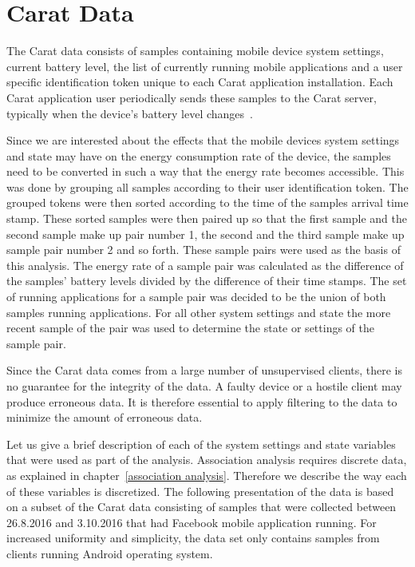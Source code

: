 \section{Carat Data} \label{carat data}

The Carat data consists of samples containing mobile device system settings, current battery level, the list of currently running mobile applications and a user specific identification token unique to each Carat application installation. Each Carat application user periodically sends these samples to the Carat server, typically when the device's battery level changes~\cite{Oliner:2013:CCE:2517351.2517354}. 

Since we are interested about the effects that the mobile devices system settings and state may have on the energy consumption rate of the device, the samples need to be converted in such a way that the energy rate becomes accessible. This was done by grouping all samples according to their user identification token. The grouped tokens were then sorted according to the time of the samples arrival time stamp. These sorted samples were then paired up so that the first sample and the second sample make up pair number 1, the second and the third sample make up sample pair number 2 and so forth. These sample pairs were used as the basis of this analysis. The energy rate of a sample pair was calculated as the difference of the samples' battery levels divided by the difference of their time stamps. The set of running applications for a sample pair was decided to be the union of both samples running applications. For all other system settings and state the more recent sample of the pair was used to determine the state or settings of the sample pair.

Since the Carat data comes from a large number of unsupervised clients, there is no guarantee for the integrity of the data. A faulty device or a hostile client may produce erroneous data. It is therefore essential to apply filtering to the data to minimize the amount of erroneous data. 

Let us give a brief description of each of the system settings and state variables that were used as part of the analysis. Association analysis requires discrete data, as explained in chapter~\ref{association analysis}. Therefore we describe the way each of these variables is discretized. The following presentation of the data is based on a subset of the Carat data consisting of samples that were collected between 26.8.2016 and 3.10.2016 that had Facebook mobile application running. For increased uniformity and simplicity, the data set only contains samples from clients running Android operating system. 

